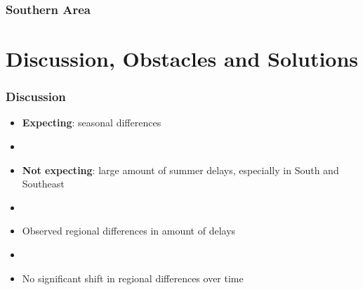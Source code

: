 \documentclass{beamer}
\begin{document}
\begin{frame}
\frametitle{Southern Area}
\begin{center}
\end{center}
\end{frame}





















\section{Discussion, Obstacles and Solutions}
\begin{frame}
\frametitle{Discussion}

\begin{itemize}
\item \textbf{Expecting}: seasonal differences

\item[]

\item \textbf{Not expecting}: large amount of summer delays, especially in South and Southeast

\item[]

\item Observed regional differences in amount of delays

\item[]

\item No significant shift in regional differences over time

\end{itemize}
\end{frame}
\end{document}
